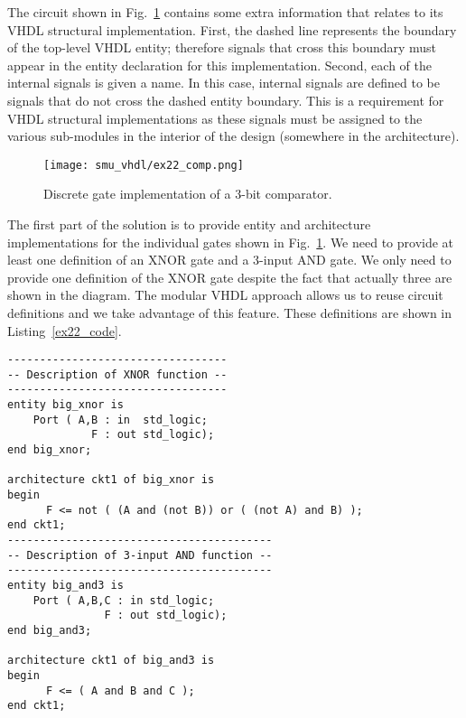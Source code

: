 The circuit shown in Fig.~\ref{ex22_comp} contains some extra information that relates to its VHDL structural implementation. First, the dashed line represents the boundary of the top-level VHDL entity; therefore signals that cross this boundary must appear in the entity declaration for this implementation. Second, each of the internal signals is given a name. In this case, internal signals are defined to be signals that do not cross the dashed entity boundary. This is a requirement for VHDL structural implementations as these signals must be assigned to the various sub-modules in the interior of the design (somewhere in the architecture).

\begin{figure}[!h]
    \centering
	\texttt{[image: smu\_vhdl/ex22\_comp.png]}
	\caption{Discrete gate implementation of a 3-bit comparator.}
	\label{ex22_comp}
\end{figure}

The first part of the solution is to provide entity and architecture implementations for the individual gates shown in Fig.~\ref{ex22_comp}. We need to provide at least one definition of an XNOR gate and a 3-input AND gate. We only need to provide one definition of the XNOR gate despite the fact that actually three are shown in the diagram. The modular VHDL approach allows us to reuse circuit definitions and we take advantage of this feature. These definitions are shown in Listing~\ref{ex22_code}.

\noindent
\begin{minipage}{0.99\linewidth}
\begin{lstlisting}[label=ex22_code, caption=Entity and Architecture definitions for discrete gates.]
----------------------------------
-- Description of XNOR function --
----------------------------------
entity big_xnor is
    Port ( A,B : in  std_logic;
             F : out std_logic);
end big_xnor;

architecture ckt1 of big_xnor is
begin
      F <= not ( (A and (not B)) or ( (not A) and B) );
end ckt1;
-----------------------------------------
-- Description of 3-input AND function --
-----------------------------------------
entity big_and3 is
    Port ( A,B,C : in std_logic;
               F : out std_logic);
end big_and3;

architecture ckt1 of big_and3 is
begin
      F <= ( A and B and C );
end ckt1;
\end{lstlisting}
\end{minipage}

